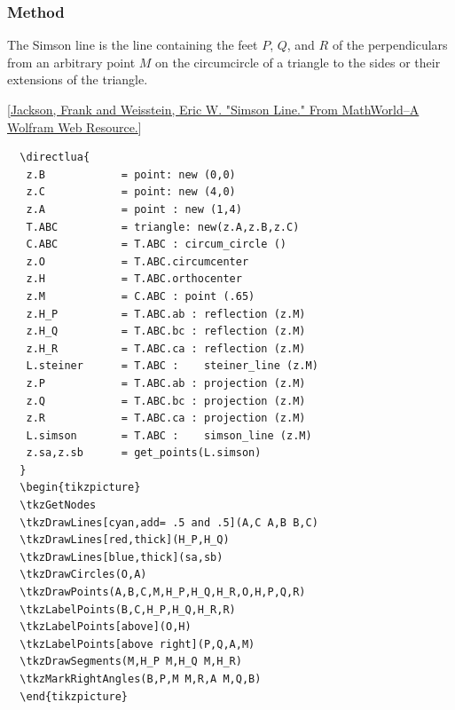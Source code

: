 
\subsubsection{Method } %
\label{ssub:method_imeth_triangle_simson__line}

The Simson line is the line containing the feet $P$, $Q$, and $R$ of the perpendiculars from an arbitrary point $M$ on the circumcircle of a triangle to the sides or their extensions of the triangle.


[\href{https://mathworld.wolfram.com/SimsonLine.html}{Jackson, Frank and Weisstein, Eric W. "Simson Line." From MathWorld--A Wolfram Web Resource.}]


\begin{Verbatim}
  \directlua{
   z.B            = point: new (0,0)
   z.C            = point: new (4,0)
   z.A            = point : new (1,4) 
   T.ABC          = triangle: new(z.A,z.B,z.C)
   C.ABC          = T.ABC : circum_circle ()
   z.O            = T.ABC.circumcenter
   z.H            = T.ABC.orthocenter
   z.M            = C.ABC : point (.65)
   z.H_P          = T.ABC.ab : reflection (z.M)
   z.H_Q          = T.ABC.bc : reflection (z.M)
   z.H_R          = T.ABC.ca : reflection (z.M)
   L.steiner      = T.ABC :    steiner_line (z.M)
   z.P            = T.ABC.ab : projection (z.M)
   z.Q            = T.ABC.bc : projection (z.M)
   z.R            = T.ABC.ca : projection (z.M)
   L.simson       = T.ABC :    simson_line (z.M)
   z.sa,z.sb      = get_points(L.simson)
  }
  \begin{tikzpicture}
  \tkzGetNodes
  \tkzDrawLines[cyan,add= .5 and .5](A,C A,B B,C)
  \tkzDrawLines[red,thick](H_P,H_Q)
  \tkzDrawLines[blue,thick](sa,sb)
  \tkzDrawCircles(O,A)
  \tkzDrawPoints(A,B,C,M,H_P,H_Q,H_R,O,H,P,Q,R)
  \tkzLabelPoints(B,C,H_P,H_Q,H_R,R)
  \tkzLabelPoints[above](O,H)
  \tkzLabelPoints[above right](P,Q,A,M)
  \tkzDrawSegments(M,H_P M,H_Q M,H_R)
  \tkzMarkRightAngles(B,P,M M,R,A M,Q,B)
  \end{tikzpicture}
\end{Verbatim}



